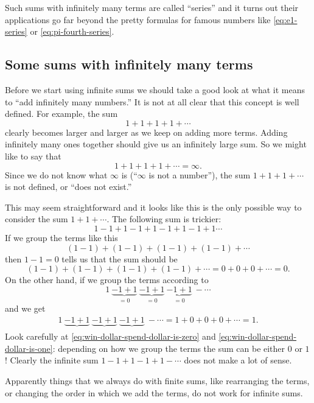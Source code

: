 Such sums with infinitely many terms are called ``series'' and it turns out
their applications go far beyond the pretty formulas for famous numbers like
\eqref{eq:e1-series} or \eqref{eq:pi-fourth-series}.   


\subsection{Some sums with infinitely many terms} %
Before we start using infinite sums we should take a good look at what it means
to ``add infinitely many numbers.''  It is not at all clear that this concept is
well defined.  For example, the sum
\[
  1+1+1+1+\cdots
\]
clearly becomes larger and larger as we keep on adding more terms.  Adding
infinitely many ones together should give us an infinitely large sum.  So we
might like to say that
\[
  1+1+1+1+\cdots = \infty.
\]
Since we do not know what $\infty$ is (``$\infty$ is not a number''), the sum
$1+1+1+\cdots$ is not defined, or ``does not exist.''

This may seem straightforward and it looks like this is the only possible way
to consider the sum $1+1+\cdots$.  The following sum is trickier:
\[
  1-1+1-1+1-1+1-1+1 \cdots
\]
If we group the terms like this
\[
(1-1)+(1-1)+(1-1)+(1-1)+\cdots
\]
then $1-1=0$ tells us that the sum should be
\begin{equation}
  (1-1)+(1-1)+(1-1)+(1-1)+\cdots = 0+0+0+\cdots = 0.
  \label{eq:win-dollar-spend-dollar-is-zero}
\end{equation}
On the other hand, if we group the terms according to
\[
  1~\underbrace{-1+1}_{=0}~\underbrace{-1+1}_{=0}~\underbrace{-1+1}_{=0}~-\cdots
\]
and we get
\begin{gather}
  1~\underbrace{-1+1}_{}~\underbrace{-1+1}_{}~\underbrace{-1+1}_{}~-\cdots
  = 1+0+0+0+\cdots = 1.
  \label{eq:win-dollar-spend-dollar-is-one}
\end{gather}
Look carefully at \eqref{eq:win-dollar-spend-dollar-is-zero} and
\eqref{eq:win-dollar-spend-dollar-is-one}:  depending on how we group the terms
the sum can be either $0$ or $1$!
Clearly the infinite sum $1-1+1-1+1-\cdots$ does not make a lot of sense.

Apparently things that we always do with finite sums, like rearranging the
terms, or changing the order in which we add the terms, do not work for infinite
sums.

